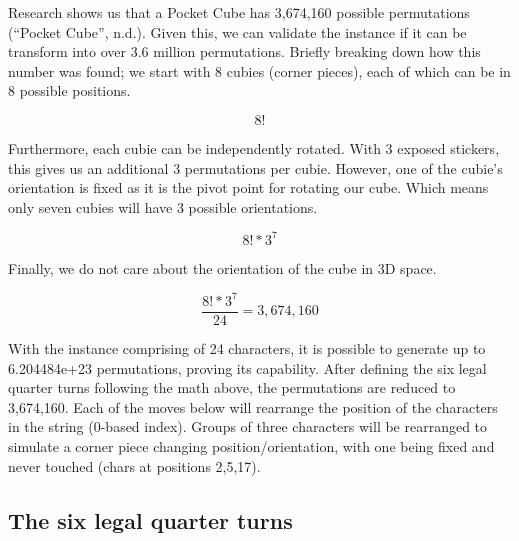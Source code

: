 \documentclass[a4paper]{article}
\begin{document}
\par Research shows us that a Pocket Cube has 3,674,160 possible permutations (“Pocket Cube”, n.d.). Given this, we can validate the instance if it can be transform into over 3.6 million permutations. Briefly breaking down how this number was found; we start with 8 cubies (corner pieces), each of which can be in 8 possible positions.

\[8!\]

\par Furthermore, each cubie can be independently rotated. With 3 exposed stickers, this gives us an additional 3 permutations per cubie. However, one of the cubie's orientation is fixed as it is the pivot point for rotating our cube. Which means only seven cubies will have 3 possible orientations.

\[8!*3^7\]

\par Finally, we do not care about the orientation of the cube in 3D space.

\[\frac{8!*3^7}{24} = 3,674,160\]

\par With the instance comprising of 24 characters, it is possible to generate up to 6.204484e+23 permutations, proving its capability. After defining the six legal quarter turns following the math above, the permutations are reduced to 3,674,160. Each of the moves below will rearrange the position of the characters in the string (0-based index). Groups of three characters will be rearranged to simulate a corner piece changing position/orientation, with one being fixed and never touched (chars at positions 2,5,17).

\subsection{The six legal quarter turns}
\end{document}
